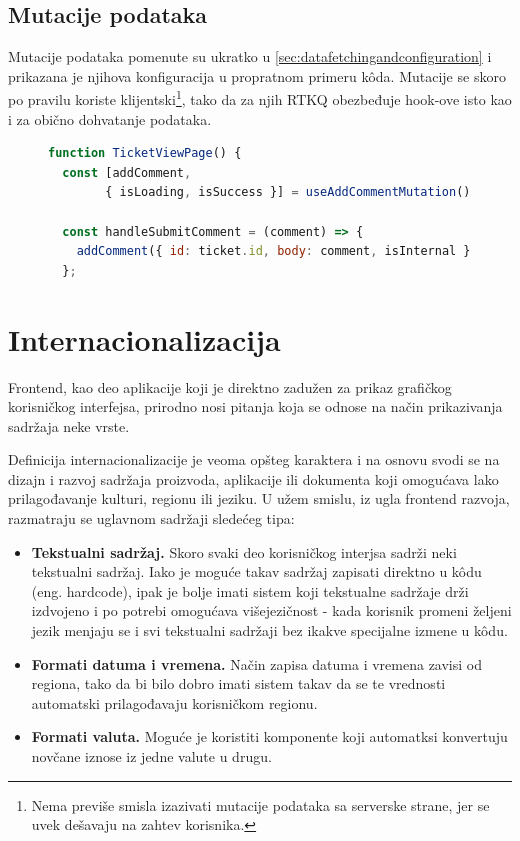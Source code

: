 \documentclass[12pt,oneside]{memoir}
\begin{document}
\newpage
\subsection{Mutacije podataka}

Mutacije podataka pomenute su ukratko u \ref{sec:datafetchingandconfiguration} i prikazana je njihova konfiguracija u propratnom primeru k\^{o}da. Mutacije se skoro po pravilu koriste klijentski\footnote{Nema previše smisla izazivati mutacije podataka sa serverske strane, jer se uvek dešavaju na zahtev korisnika.}, tako da za njih RTKQ obezbeđuje hook-ove isto kao i za obično dohvatanje podataka.

\begin{figure}[h]
\begin{lstlisting}[language=JavaScript, style=ES6, caption={Korišćenje RTKQ mutacija na primeru dodavanja komentara na tiket.}]
function TicketViewPage() {
  const [addComment,
        { isLoading, isSuccess }] = useAddCommentMutation();

  const handleSubmitComment = (comment) => {
    addComment({ id: ticket.id, body: comment, isInternal });
  };
\end{lstlisting}
\end{figure}


\section{Internacionalizacija}
\label{sec:intl}

Frontend, kao deo aplikacije koji je direktno zadužen za prikaz grafičkog korisničkog interfejsa, prirodno nosi pitanja koja se odnose na način prikazivanja sadržaja neke vrste. 

Definicija internacionalizacije je veoma opšteg karaktera i na osnovu \cite{i18n} svodi se na dizajn i razvoj sadržaja proizvoda, aplikacije ili dokumenta koji omogućava lako prilagođavanje kulturi, regionu ili jeziku. U užem smislu, iz ugla frontend razvoja, razmatraju se uglavnom sadržaji sledećeg tipa:

\begin{itemize}
    \item \textbf{Tekstualni sadržaj.} Skoro svaki deo korisničkog interjsa sadrži neki tekstualni sadržaj. Iako je moguće takav sadržaj zapisati direktno u k\^{o}du (eng. hardcode), ipak je bolje imati sistem koji tekstualne sadržaje drži izdvojeno i po potrebi omogućava višejezičnost - kada korisnik promeni željeni jezik menjaju se i svi tekstualni sadržaji bez ikakve specijalne izmene u k\^{o}du.
    \item \textbf{Formati datuma i vremena.} Način zapisa datuma i vremena zavisi od regiona, tako da bi bilo dobro imati sistem takav da se te vrednosti automatski prilagođavaju korisničkom regionu.
    \item \textbf{Formati valuta.} Moguće je koristiti komponente koji automatksi konvertuju novčane iznose iz jedne valute u drugu.
\end{itemize}
\end{document}
